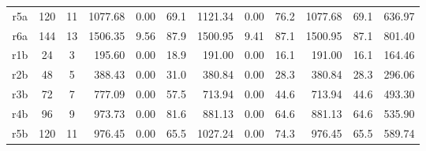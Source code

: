 \begin{landscape}
\begin{table}[]
\begin{tabular}{cccrrrrrrrrr}
  r5a                  & 120                  & 11                   & 1077.68                     & 0.00                       & 69.1                        & 1121.34                 & 0.00                       & 76.2                        & 1077.68                 & 69.1                        & 636.97                               \\
  r6a                  & 144                  & 13                   & 1506.35                     & 9.56                       & 87.9                        & 1500.95                 & 9.41                       & 87.1                        & 1500.95                 & 87.1                        & 801.40                               \\
  r1b                  & 24                   & 3                    & 195.60                      & 0.00                       & 18.9                        & 191.00                  & 0.00                       & 16.1                        & 191.00                  & 16.1                        & 164.46                               \\
  r2b                  & 48                   & 5                    & 388.43                      & 0.00                       & 31.0                        & 380.84                  & 0.00                       & 28.3                        & 380.84                  & 28.3                        & 296.06                               \\
  r3b                  & 72                   & 7                    & 777.09                      & 0.00                       & 57.5                        & 713.94                  & 0.00                       & 44.6                        & 713.94                  & 44.6                        & 493.30                               \\
  r4b                  & 96                   & 9                    & 973.73                      & 0.00                       & 81.6                        & 881.13                  & 0.00                       & 64.6                        & 881.13                  & 64.6                        & 535.90                               \\
  r5b                  & 120                  & 11                   & 976.45                      & 0.00                       & 65.5                        & 1027.24                 & 0.00                       & 74.3                        & 976.45                  & 65.5                        & 589.74                               \\

\end{tabular}
\end{table}
\end{landscape}
